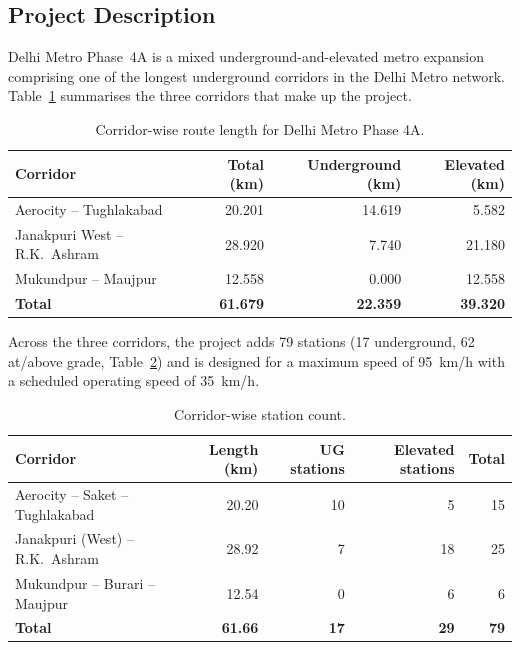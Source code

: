 \documentclass[11pt]{article}
\begin{document}
\subsection{Project Description}
Delhi Metro Phase~4A is a mixed underground-and-elevated metro expansion comprising one of the longest
underground corridors in the Delhi Metro network. Table~\ref{tab:corridors} summarises the three
corridors that make up the project.

\begin{table}[H]
  \centering
  \caption{Corridor-wise route length for Delhi Metro Phase 4A.}
  \label{tab:corridors}
  \begin{tabular}{@{}lrrr@{}}
    \toprule
    \textbf{Corridor} & \textbf{Total (km)} & \textbf{Underground (km)} & \textbf{Elevated (km)} \\
    \midrule
    Aerocity -- Tughlakabad       & 20.201 & 14.619 & 5.582 \\
    Janakpuri West -- R.K.\ Ashram & 28.920 & 7.740  & 21.180 \\
    Mukundpur -- Maujpur          & 12.558 & 0.000  & 12.558 \\
    \midrule
    \textbf{Total}                & \textbf{61.679} & \textbf{22.359} & \textbf{39.320} \\
    \bottomrule
  \end{tabular}
\end{table}

Across the three corridors, the project adds 79 stations (17 underground, 62 at/above grade,
Table~\ref{tab:stations}) and is designed for a maximum speed of 95~km/h with a scheduled operating
speed of 35~km/h.

\begin{table}[H]
  \centering
  \caption{Corridor-wise station count.}
  \label{tab:stations}
  \small
  \begin{tabular}{@{}p{4.3cm}rrrr@{}}
    \toprule
    \textbf{Corridor} & \textbf{Length (km)} & \textbf{UG stations} & \textbf{Elevated stations} & \textbf{Total} \\
    \midrule
    Aerocity -- Saket -- Tughlakabad & 20.20 & 10 & 5  & 15 \\
    Janakpuri (West) -- R.K.\ Ashram & 28.92 & 7  & 18 & 25 \\
    Mukundpur -- Burari -- Maujpur   & 12.54 & 0  & 6  & 6 \\
    \midrule
    \textbf{Total}                    & \textbf{61.66} & \textbf{17} & \textbf{29} & \textbf{79} \\
    \bottomrule
  \end{tabular}
\end{table}
\end{document}
